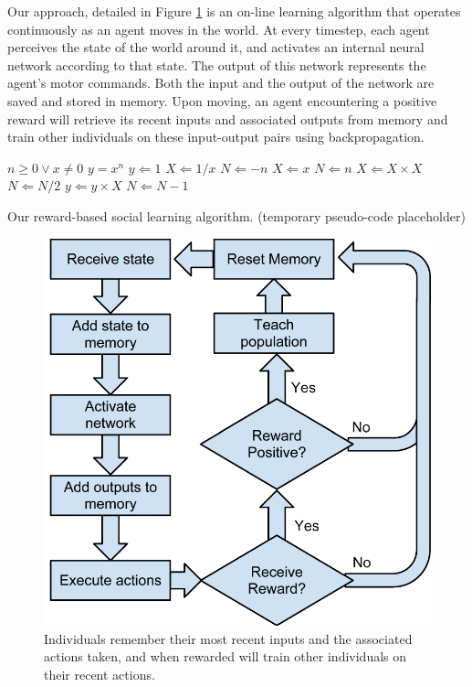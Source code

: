 \documentclass{acm_proc_article-sp}
\begin{document}
Our approach, detailed in Figure \ref{fig:flowchart} is an on-line learning algorithm that operates continuously as an agent moves in the world. At every timestep, each agent perceives the state of the world around it, and activates an internal neural network according to that state. The output of this network represents the agent's motor commands. Both the input and the output of the network are saved and stored in memory. Upon moving, an agent encountering a positive reward will retrieve its recent inputs and associated outputs from memory and train other individuals on these input-output pairs using backpropagation.

\begin{algorithm}
\begin{algorithmic}
\REQUIRE $n \geq 0 \vee x \neq 0$
\ENSURE $y = x^n$
\STATE $y \Leftarrow 1$
\STATE $X \Leftarrow 1 / x$
\STATE $N \Leftarrow -n$
\ELSE
\STATE $X \Leftarrow x$
\STATE $N \Leftarrow n$
\ENDIF
{}
\STATE $X \Leftarrow X \times X$
\STATE $N \Leftarrow N / 2$
\ELSE[$N$ is odd]
\STATE $y \Leftarrow y \times X$
\STATE $N \Leftarrow N - 1$
\ENDIF
\ENDWHILE
\end{algorithmic}
\caption{Our reward-based social learning algorithm. (temporary pseudo-code placeholder)}
\label{alg:rewardsbased}
\end{algorithm}

\begin{figure}
  \centering
    \includegraphics[scale=.6]{flowchart.pdf}
  \caption{Individuals remember their most recent inputs and the associated actions taken, and when rewarded will train other individuals on their recent actions.}
  \label{fig:flowchart}
\end{figure}
\end{document}
